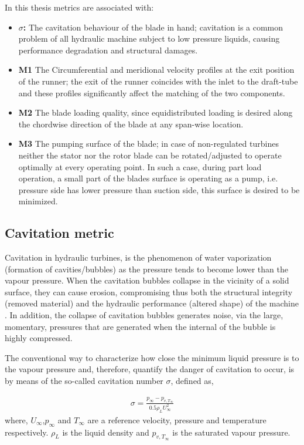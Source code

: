In this thesis metrics are associated with:
\begin{itemize}
\item{\textbf{$\sigma$:}} The cavitation behaviour of the blade in hand; cavitation is a common problem of all hydraulic machine subject to low pressure liquids, causing performance degradation and structural damages.
\item{\textbf{M1}} The Circumferential and meridional velocity profiles at the exit position of the runner; the exit of the runner coincides with the inlet to the draft-tube and these profiles significantly affect the matching of the two components.
\item{\textbf{M2}} The blade loading quality, since equidistributed loading is desired along the chordwise direction of the blade at any span-wise location.
\item{\textbf{M3}} The pumping surface of the blade; in case of non-regulated turbines neither the stator nor the rotor blade can be rotated/adjusted to operate optimally at every operating point. In such a case, during  part load operation, a small part of the blades surface is operating as a pump, i.e. pressure side has lower pressure than suction side, this surface is desired to be minimized.
\end{itemize}


\subsection{Cavitation metric}
Cavitation in hydraulic turbines, is the phenomenon of water vaporization (formation of cavities/bubbles) as the pressure tends to become lower than the vapour pressure. When the cavitation bubbles collapse in the vicinity of a solid surface, they can cause erosion, compromising thus both the structural integrity (removed material) and the hydraulic performance (altered shape) of the machine \cite{thiruvengadam1974handbook,knapp1970cavitation,brennen1995cavitation}.  In addition, the collapse of cavitation bubbles generates noise, via the large, momentary, pressures that are generated when the internal of the bubble is highly compressed.

The conventional way to characterize how close the minimum liquid pressure is to the vapour pressure and, therefore, quantify the danger of cavitation to occur, is by means of the so-called cavitation number $\sigma$, defined as,

\begin{eqnarray}
		\sigma=\frac{p_{\infty}-p_{v,T_{\infty}}}{0.5\rho_{L}U^2_{\infty}}
\label{Cavi}
\end{eqnarray}
where, $U_{\infty}$,$p_{\infty}$ and $T_{\infty}$ are a reference velocity, pressure and temperature respectively. $\rho_{L}$ is the liquid density and $p_{v,T_{\infty}}$  is the saturated vapour pressure. 

